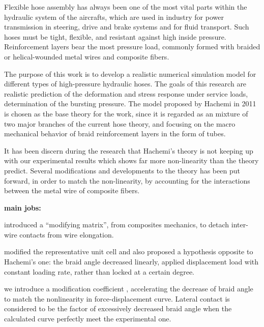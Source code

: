 \begin{englishabstract}

Flexible hose assembly has always been one of the most vital parts within the hydraulic system of the aircrafts, which are used in industry for power transmission in steering, drive and brake systems and for fluid transport. Such hoses must be tight, flexible, and resistant against high inside pressure. Reinforcement layers bear the most pressure load, commonly formed with braided or helical-wounded metal wires and composite fibers.

The purpose of this work is to develop a realistic numerical simulation model for different types of high-pressure hydraulic hoses. The goals of this research are realistic prediction of the deformation and stress response under service loads, determination of the bursting pressure. The model proposed by Hachemi in 2011 is chosen as the base theory for the work, since it is regarded as an mixture of two major branches of the current hose theory, and focusing on the macro mechanical behavior of braid reinforcement layers in the form of tubes.

It has been discern during the research that Hachemi's theory is not keeping up with our experimental results which shows far more non-linearity than the theory predict.
Several modifications and developments to the theory has been put forward, in order to match the non-linearity, by accounting for the interactions between the metal wire of composite fibers.




\textbf{main jobs:}
\begin{compactenum}
	\item  introduced a “modifying matrix”, from composites mechanics, to detach inter-wire contacts from wire elongation. 
	
	\item  modified the representative unit cell  and  also proposed a hypothesis opposite to Hachemi’s one: the braid angle decreased linearly, applied displacement load with constant loading rate, rather than locked at a certain degree. 
	\item  we introduce a modification coefficient , accelerating the decrease of braid angle to match the nonlinearity in force-displacement curve. Lateral contact is considered to be the factor of excessively decreased braid angle when the calculated curve perfectly meet the experimental one.

\end{compactenum}


\end{englishabstract}
